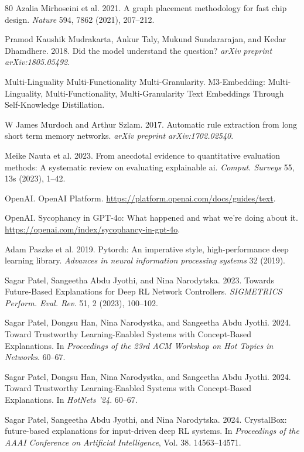\documentclass[11pt,a4paper]{article}
\begin{document}
\begin{thebibliography}{80}
 Azalia Mirhoseini et al. 2021. A graph placement methodology for fast chip design. \emph{Nature} 594, 7862 (2021), 207--212.

 Pramod Kaushik Mudrakarta, Ankur Taly, Mukund Sundararajan, and Kedar Dhamdhere. 2018. Did the model understand the question? \emph{arXiv preprint arXiv:1805.05492}.

 Multi-Linguality Multi-Functionality Multi-Granularity. M3-Embedding: Multi-Linguality, Multi-Functionality, Multi-Granularity Text Embeddings Through Self-Knowledge Distillation.

 W James Murdoch and Arthur Szlam. 2017. Automatic rule extraction from long short term memory networks. \emph{arXiv preprint arXiv:1702.02540}.

 Meike Nauta et al. 2023. From anecdotal evidence to quantitative evaluation methods: A systematic review on evaluating explainable ai. \emph{Comput. Surveys} 55, 13s (2023), 1--42.

 OpenAI. OpenAI Platform. \url{https://platform.openai.com/docs/guides/text}.

 OpenAI. Sycophancy in GPT-4o: What happened and what we're doing about it. \url{https://openai.com/index/sycophancy-in-gpt-4o}.

 Adam Paszke et al. 2019. Pytorch: An imperative style, high-performance deep learning library. \emph{Advances in neural information processing systems} 32 (2019).

 Sagar Patel, Sangeetha Abdu Jyothi, and Nina Narodytska. 2023. Towards Future-Based Explanations for Deep RL Network Controllers. \emph{SIGMETRICS Perform. Eval. Rev.} 51, 2 (2023), 100--102.

 Sagar Patel, Dongsu Han, Nina Narodystka, and Sangeetha Abdu Jyothi. 2024. Toward Trustworthy Learning-Enabled Systems with Concept-Based Explanations. In \emph{Proceedings of the 23rd ACM Workshop on Hot Topics in Networks}. 60--67.

 Sagar Patel, Dongsu Han, Nina Narodystka, and Sangeetha Abdu Jyothi. 2024. Toward Trustworthy Learning-Enabled Systems with Concept-Based Explanations. In \emph{HotNets '24}. 60--67.

 Sagar Patel, Sangeetha Abdu Jyothi, and Nina Narodytska. 2024. CrystalBox: future-based explanations for input-driven deep RL systems. In \emph{Proceedings of the AAAI Conference on Artificial Intelligence}, Vol. 38. 14563--14571.


\end{thebibliography}
\end{document}
